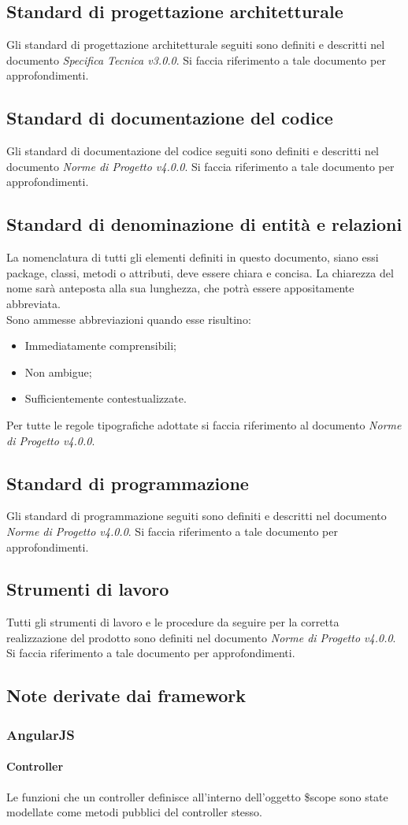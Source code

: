 \subsection{Standard di progettazione architetturale}
Gli standard di progettazione architetturale seguiti sono definiti e descritti nel documento \textit{Specifica Tecnica v3.0.0}. Si faccia riferimento a tale
documento per approfondimenti.

\subsection{Standard di documentazione del codice}
Gli standard di documentazione del codice seguiti sono definiti e descritti nel documento \textit{Norme di Progetto v4.0.0}. Si faccia riferimento a tale
documento per approfondimenti.

\subsection{Standard di denominazione di entità e relazioni}
La nomenclatura di tutti gli elementi definiti in questo documento, siano essi package, classi, metodi o attributi, deve essere chiara e concisa. 
La chiarezza del nome sarà anteposta alla sua lunghezza, che potrà essere appositamente abbreviata. \\
\noindent Sono ammesse abbreviazioni quando esse risultino:
\begin{itemize}
	 \item Immediatamente comprensibili;
	 \item Non ambigue;
	 \item Sufficientemente contestualizzate.
\end{itemize}
Per tutte le regole tipografiche adottate si faccia riferimento al documento \textit{Norme di Progetto v4.0.0}.

\subsection{Standard di programmazione}
Gli standard di programmazione seguiti sono definiti e descritti nel documento \textit{Norme di Progetto v4.0.0}. Si faccia riferimento a tale
documento per approfondimenti.

\subsection{Strumenti di lavoro}
Tutti gli strumenti di lavoro e le procedure da seguire per la corretta realizzazione del prodotto sono definiti nel documento \textit{Norme di Progetto v4.0.0}.
Si faccia riferimento a tale documento per approfondimenti.

\subsection{Note derivate dai framework}
	\subsubsection{AngularJS}
		\paragraph{Controller}
		Le funzioni che un controller definisce all'interno dell'oggetto \$scope sono state modellate come metodi pubblici del controller stesso.
